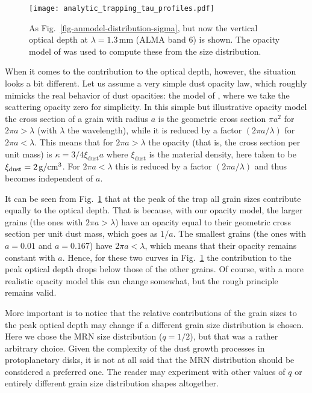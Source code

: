\documentclass{aa}
\def\cm{\hbox{cm}}
\begin{document}
\begin{figure}
\centerline{\texttt{[image: analytic\_trapping\_tau\_profiles.pdf]}}
\caption{\label{fig-anmodel-distribution-tau}As Fig.~\ref{fig-anmodel-distribution-sigma},
  but now the vertical optical depth at $\lambda=1.3\,\mathrm{mm}$ (ALMA band 6)
  is shown. The opacity model of \citet{1997MNRAS.291..121I} was used to compute these
from the size distribution.} 
\end{figure}

When it comes to the contribution to the optical depth, however, the situation
looks a bit different. Let us assume a very simple dust opacity law, which
roughly mimicks the real behavior of dust opacities: the model of
\citet{1997MNRAS.291..121I}, where we take the scattering opacity zero for
simplicity. In this simple but illustrative opacity model the cross
section of a grain with radius $a$ is the geometric cross section $\pi a^2$
for $2\pi a>\lambda$ (with $\lambda$ the wavelength), while it is reduced by
a factor $(2\pi a/\lambda)$ for $2\pi a<\lambda$. This means that for
$2\pi a>\lambda$ the opacity (that is, the cross section per unit mass)
is $\kappa=3/4\xi_{\mathrm{dust}} a$ where $\xi_{\mathrm{dust}}$ is the material
density, here taken to be $\xi_{\mathrm{dust}}=2\,\mathrm{g}/\cm^3$. For
$2\pi a<\lambda$ this is reduced by a factor $(2\pi a/\lambda)$ and
thus becomes independent of $a$.

It can be seen from Fig.~\ref{fig-anmodel-distribution-tau} that at the peak of
the trap all grain sizes contribute equally to the optical depth. That is
because, with our opacity model, the larger grains (the ones with $2\pi a >
\lambda$) have an opacity equal to their geometric cross section per unit dust
mass, which goes as $1/a$. The smallest grains (the ones with $a=0.01$ and
$a=0.167$) have $2\pi a < \lambda$, which means that their opacity remains
constant with $a$. Hence, for these two curves in
Fig.~\ref{fig-anmodel-distribution-tau} the contribution to the peak optical
depth drops below those of the other grains. Of course, with a more realistic
opacity model this can change somewhat, but the rough principle remains valid.

More important is to notice that the relative contributions of the grain sizes
to the peak optical depth may change if a different grain size distribution is
chosen. Here we chose the MRN size distribution ($q=1/2$), but that was a rather
arbitrary choice. Given the complexity of the dust growth processes in
protoplanetary disks, it is not at all said that the MRN distribution should be
considered a preferred one. The reader may experiment with other values of
$q$ or entirely different grain size distribution shapes altogether.
\end{document}
